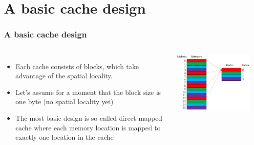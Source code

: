 \documentclass{beamer}
\begin{document}
\section{A basic cache design}
\begin{frame}
\frametitle{A basic cache design}
\begin{columns}[c]
\begin{itemize}
\item Each cache consists of {\color{red}blocks}, which take advantage of the spatial locality.
\item Let's assume for a moment that the block size is one byte (no spatial locality yet) 
\item The most basic design is so called {\color{green}direct-mapped} cache where each memory location is mapped to exactly one location in the cache
\end{itemize}
\includegraphics[scale=0.4]{basic.png}
\end{columns}
\end{frame}
\end{document}
